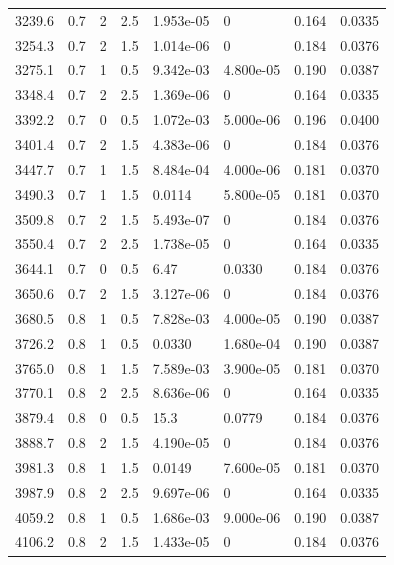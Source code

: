 \documentclass[preview]{standalone}
\begin{document}
{{{\begin{tabular}{L{1.2cm}C{1.2cm} C{0.3cm}C{0.5cm} C{1.4cm}C{1.4cm} C{1.4cm}C{1.4cm}}
  3239.6  &   0.7  & 2     & 2.5 &  1.953e-05  & 0  & 0.164 &  0.0335   \\ 
  3254.3  &   0.7  & 2     & 1.5 &  1.014e-06  & 0  & 0.184 &  0.0376   \\ 
  3275.1  &   0.7  & 1     & 0.5 &  9.342e-03  & 4.800e-05  & 0.190 &  0.0387   \\ 
  3348.4  &   0.7  & 2     & 2.5 &  1.369e-06  & 0  & 0.164 &  0.0335   \\ 
  3392.2  &   0.7  & 0     & 0.5 &  1.072e-03  & 5.000e-06  & 0.196 &  0.0400   \\ 
  3401.4  &   0.7  & 2     & 1.5 &  4.383e-06  & 0  & 0.184 &  0.0376   \\ 
  3447.7  &   0.7  & 1     & 1.5 &  8.484e-04  & 4.000e-06  & 0.181 &  0.0370   \\ 
  3490.3  &   0.7  & 1     & 1.5 &  0.0114  & 5.800e-05  & 0.181 &  0.0370   \\ 
  3509.8  &   0.7  & 2     & 1.5 &  5.493e-07  & 0  & 0.184 &  0.0376   \\ 
  3550.4  &   0.7  & 2     & 2.5 &  1.738e-05  & 0  & 0.164 &  0.0335   \\ 
  3644.1  &   0.7  & 0     & 0.5 &  6.47  & 0.0330  & 0.184 &  0.0376   \\ 
  3650.6  &   0.7  & 2     & 1.5 &  3.127e-06  & 0  & 0.184 &  0.0376   \\ 
  3680.5  &   0.8  & 1     & 0.5 &  7.828e-03  & 4.000e-05  & 0.190 &  0.0387   \\ 
  3726.2  &   0.8  & 1     & 0.5 &  0.0330  & 1.680e-04  & 0.190 &  0.0387   \\ 
  3765.0  &   0.8  & 1     & 1.5 &  7.589e-03  & 3.900e-05  & 0.181 &  0.0370   \\ 
  3770.1  &   0.8  & 2     & 2.5 &  8.636e-06  & 0  & 0.164 &  0.0335   \\ 
  3879.4  &   0.8  & 0     & 0.5 &  15.3  & 0.0779  & 0.184 &  0.0376   \\ 
  3888.7  &   0.8  & 2     & 1.5 &  4.190e-05  & 0  & 0.184 &  0.0376   \\ 
  3981.3  &   0.8  & 1     & 1.5 &  0.0149  & 7.600e-05  & 0.181 &  0.0370   \\ 
  3987.9  &   0.8  & 2     & 2.5 &  9.697e-06  & 0  & 0.164 &  0.0335   \\ 
  4059.2  &   0.8  & 1     & 0.5 &  1.686e-03  & 9.000e-06  & 0.190 &  0.0387   \\ 
  4106.2  &   0.8  & 2     & 1.5 &  1.433e-05  & 0  & 0.184 &  0.0376   \\ 

\end{tabular}}}}
\end{document}
